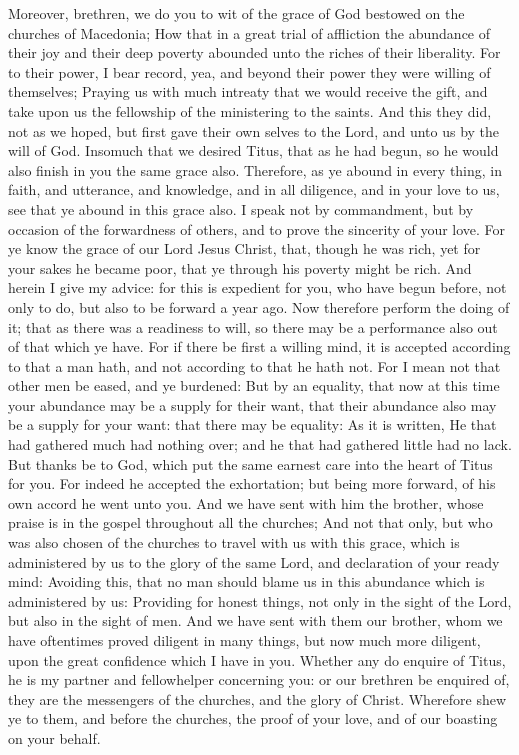  Moreover, brethren, we do you to wit of the grace of God
bestowed on the churches of Macedonia;  How that in a great
trial of affliction the abundance of their joy and their deep poverty
abounded unto the riches of their liberality.  For to their
power, I bear record, yea, and beyond their power they were willing of
themselves;  Praying us with much intreaty that we would
receive the gift, and take upon us the fellowship of the ministering to
the saints.  And this they did, not as we hoped, but first
gave their own selves to the Lord, and unto us by the will of God.
 Insomuch that we desired Titus, that as he had begun, so he
would also finish in you the same grace also.  Therefore, as
ye abound in every thing, in faith, and utterance, and knowledge, and in
all diligence, and in your love to us, see that ye abound in this grace
also.  I speak not by commandment, but by occasion of the
forwardness of others, and to prove the sincerity of your love.
 For ye know the grace of our Lord Jesus Christ, that,
though he was rich, yet for your sakes he became poor, that ye through
his poverty might be rich.  And herein I give my advice:
for this is expedient for you, who have begun before, not only to do,
but also to be forward a year ago.  Now therefore perform
the doing of it; that as there was a readiness to will, so there may be
a performance also out of that which ye have.  For if there
be first a willing mind, it is accepted according to that a man hath,
and not according to that he hath not.  For I mean not that
other men be eased, and ye burdened:  But by an equality,
that now at this time your abundance may be a supply for their want,
that their abundance also may be a supply for your want: that there may
be equality:  As it is written, He that had gathered much
had nothing over; and he that had gathered little had no lack.
 But thanks be to God, which put the same earnest care into
the heart of Titus for you.  For indeed he accepted the
exhortation; but being more forward, of his own accord he went unto you.
 And we have sent with him the brother, whose praise is in
the gospel throughout all the churches;  And not that only,
but who was also chosen of the churches to travel with us with this
grace, which is administered by us to the glory of the same Lord, and
declaration of your ready mind:  Avoiding this, that no man
should blame us in this abundance which is administered by us:
 Providing for honest things, not only in the sight of the
Lord, but also in the sight of men.  And we have sent with
them our brother, whom we have oftentimes proved diligent in many
things, but now much more diligent, upon the great confidence which I
have in you.  Whether any do enquire of Titus, he is my
partner and fellowhelper concerning you: or our brethren be enquired of,
they are the messengers of the churches, and the glory of Christ.
 Wherefore shew ye to them, and before the churches, the
proof of your love, and of our boasting on your behalf.

